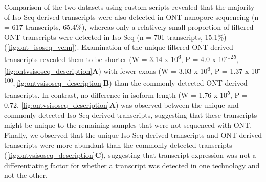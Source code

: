 Comparison of the two datasets using custom scripts revealed that the majority of Iso-Seq-derived transcripts were also detected in ONT nanopore sequencing (n = 617 transcripts, 65.4\%), whereas only a relatively small proportion of filtered ONT-transcripts were detected in Iso-Seq (n = 701 transcripts, 15.1\%) (\cref{fig:ont_isoseq_venn}). Examination of the unique filtered ONT-derived transcripts revealed them to be shorter (W = 3.14 x 10\textsuperscript{6}, P = 4.0 x 10\textsuperscript{-125}, \cref{fig:ontvsisoseq_description}\textbf{A}) with fewer exons (W = 3.03 x 10\textsuperscript{6}, P = 1.37 x 10\textsuperscript{-100},\cref{fig:ontvsisoseq_description}\textbf{B}) than the commonly detected ONT-derived transcripts. In contrast, no difference in isoform length (W = 1.76 x 10\textsuperscript{5}, P = 0.72, \cref{fig:ontvsisoseq_description}\textbf{A}) was observed between the unique and commonly detected Iso-Seq derived transcripts, suggesting that these transcripts might be unique to the remaining samples that were not sequenced with ONT. Finally, we observed that the unique Iso-Seq-derived transcripts and ONT-derived transcripts were more abundant than the commonly detected transcripts (\cref{fig:ontvsisoseq_description}\textbf{C}), suggesting that transcript expression was not a differentiating factor for whether a transcript was detected in one technology and not the other. 

